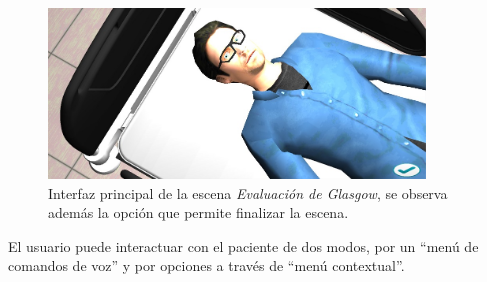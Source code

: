\begin{figure}[hbt]
\centering
\includegraphics[width=10cm]{solucion/images/glasgow_principal.jpg}
\caption{Interfaz principal de la escena \emph{Evaluación de Glasgow}, se observa además
    la opción que permite finalizar la escena.}
\label{fig:glasgow_principal}
\end{figure}

El usuario puede interactuar con el paciente de dos modos, por un \enquote{menú
    de comandos de voz} y por opciones a través de \enquote{menú contextual}. 

